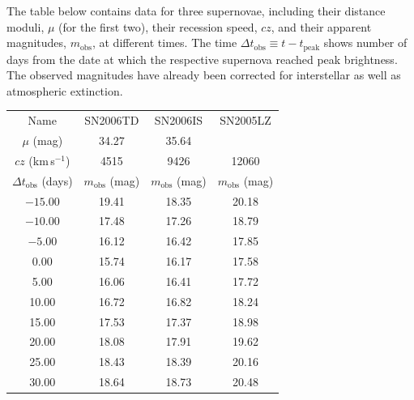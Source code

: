 The table below contains data for three supernovae, including their distance
moduli, $\mu$ (for the first two), their recession speed, $cz$, and their
apparent magnitudes, $m_{\mathrm{obs}}$, at different times. The time
$\Delta t_{\mathrm{obs}} \equiv t - t_{\mathrm{peak}}$ shows number of days
from the date at which the respective supernova reached peak brightness. The
observed magnitudes have already been corrected for interstellar as well as
atmospheric extinction.

\begin{center}
\begin{tabular}{c|c|c|c}
Name & SN2006TD & SN2006IS & SN2005LZ \\
$\mu$ (mag) & 34.27 & 35.64 & \\
$cz$ (km\,s$^{-1}$) & 4515 & 9426 & 12060 \\
\hline
$\Delta t_{\mathrm{obs}}$ (days) & $m_{\mathrm{obs}}$ (mag)
  & $m_{\mathrm{obs}}$ (mag) & $m_{\mathrm{obs}}$ (mag) \\
\hline
$-15.00$ & 19.41 & 18.35 & 20.18 \\
$-10.00$ & 17.48 & 17.26 & 18.79 \\
$-5.00$  & 16.12 & 16.42 & 17.85 \\
0.00     & 15.74 & 16.17 & 17.58 \\
5.00     & 16.06 & 16.41 & 17.72 \\
10.00    & 16.72 & 16.82 & 18.24 \\
15.00    & 17.53 & 17.37 & 18.98 \\
20.00    & 18.08 & 17.91 & 19.62 \\
25.00    & 18.43 & 18.39 & 20.16 \\
30.00    & 18.64 & 18.73 & 20.48 \\
\end{tabular}
\end{center}

